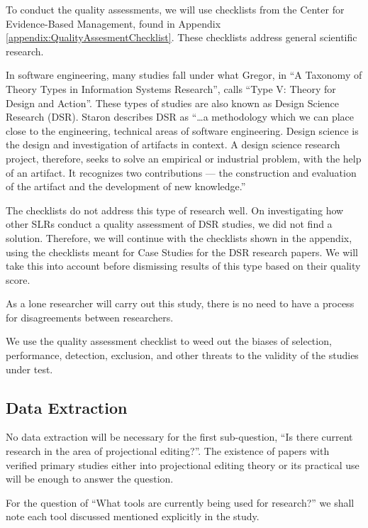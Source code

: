 To conduct the quality assessments, we will use checklists from the Center for Evidence-Based Management, found in Appendix \ref{appendix:QualityAssesmentChecklist}.
These checklists address general scientific research.

In software engineering, many studies fall under what Gregor\cite{gregor2006nature}, in ``A Taxonomy of Theory Types in Information Systems Research'', calls ``Type V: Theory for Design and Action''.
These types of studies are also known as Design Science Research (DSR).
Staron\cite{Staron_2019} describes DSR as ``\dots a methodology which we can place close to the engineering, technical areas of software engineering. 
Design science is the design and investigation of artifacts in context. 
A design science research project, therefore, seeks to solve an empirical or industrial problem, with the help of an artifact. 
It recognizes two contributions — the construction and evaluation of the artifact and the development of new knowledge.''

The checklists do not address this type of research well.
On investigating how other SLRs conduct a quality assessment of DSR studies, we did not find a solution.
Therefore, we will continue with the checklists shown in the appendix, using the checklists meant for Case Studies for the DSR research papers.
We will take this into account before dismissing results of this type based on their quality score.

As a lone researcher will carry out this study, there is no need to have a process for disagreements between researchers.

We use the quality assessment checklist to weed out the biases of selection, performance, detection, exclusion, and other threats to the validity of the studies under test.


\subsection{Data Extraction}
\label{section:dataExtraction}
No data extraction will be necessary for the first sub-question,  ``Is there current research in the area of projectional editing?''.
The existence of papers with verified primary studies either into projectional editing theory or its practical use will be enough to answer the question.

For the question of ``What tools are currently being used for research?'' we shall note each tool discussed mentioned explicitly in the study.

